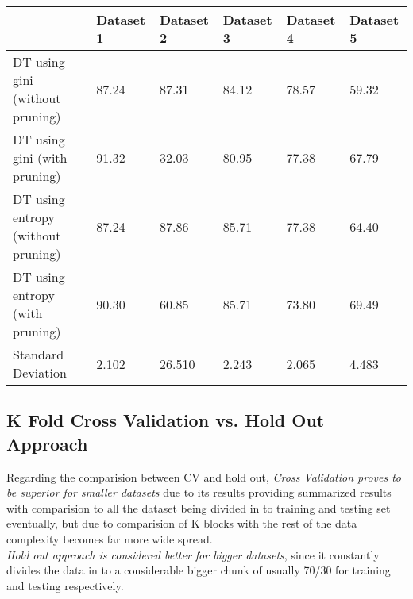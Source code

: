 \documentclass[12pt]{article}
\begin{document}
\begin{center}
\begin{tabular}{ | m{8em} | m{2cm}| m{2cm} | m{2cm} | m{2cm} | m{2cm} |} 
\hline
 & Dataset 1 & Dataset 2 & Dataset 3 & Dataset 4 & Dataset 5 \\ 
\hline
DT using gini (without pruning) & 87.24  & 87.31  & 84.12  & 78.57  & 59.32  \\ 
\hline
DT using gini (with pruning) & 91.32  & 32.03  & 80.95  & 77.38  & 67.79  \\ 
\hline
DT using entropy (without pruning) & 87.24  & 87.86  & 85.71  & 77.38  & 64.40  \\
\hline
DT using entropy (with pruning) & 90.30  & 60.85  & 85.71  & 73.80  & 69.49  \\
\hline
Standard Deviation & 2.102 & 26.510 & 2.243 & 2.065 & 4.483 \\
\hline
\end{tabular}
\end{center}

\subsection*{K Fold Cross Validation vs. Hold Out Approach}

Regarding the comparision between CV and hold out, \emph{Cross Validation proves to be superior for smaller datasets} due to its results providing summarized results with comparision to all the dataset being divided in to training and testing set eventually, but due to comparision of K blocks with the rest of the data complexity becomes far more wide spread. \\
\emph{Hold out approach is considered better for bigger datasets}, since it constantly divides the data in to a considerable bigger chunk of usually 70/30 for training and testing respectively.
\end{document}
